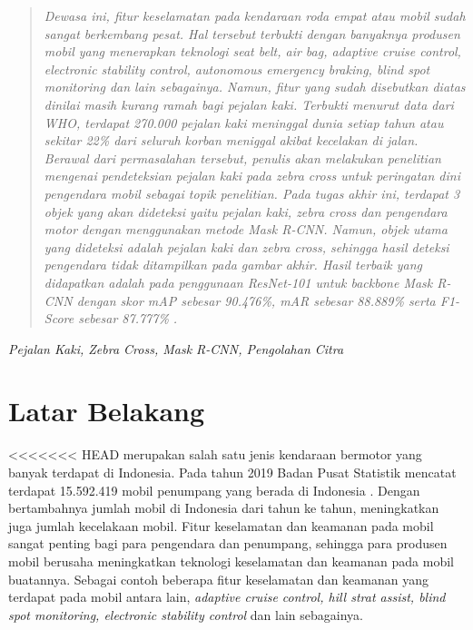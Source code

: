 \documentclass[conference]{IEEEtran}
\begin{document}
	
	\begin{abstract}
		\textit{Dewasa ini, fitur keselamatan pada kendaraan roda empat atau mobil sudah sangat berkembang pesat. Hal tersebut terbukti dengan banyaknya produsen mobil yang menerapkan teknologi \textit{seat belt, air bag, adaptive cruise control, electronic stability control, autonomous emergency braking, blind spot monitoring} dan lain sebagainya. Namun, fitur yang sudah disebutkan diatas dinilai masih kurang ramah bagi pejalan kaki. Terbukti menurut data dari WHO, terdapat 270.000 pejalan kaki meninggal dunia setiap tahun atau sekitar 22\% dari seluruh korban meniggal akibat kecelakan di jalan. Berawal dari permasalahan tersebut, penulis akan melakukan penelitian mengenai pendeteksian pejalan kaki pada \textit{zebra cross} untuk peringatan dini pengendara mobil sebagai topik penelitian. Pada tugas akhir ini, terdapat 3 objek yang akan dideteksi yaitu pejalan kaki, \textit{zebra cross} dan pengendara motor dengan menggunakan metode Mask R-CNN. Namun, objek utama yang dideteksi adalah pejalan kaki dan zebra cross, sehingga hasil deteksi pengendara tidak ditampilkan pada gambar akhir. Hasil terbaik yang didapatkan adalah pada penggunaan \textit{ResNet-101} untuk \textit{backbone Mask R-CNN} dengan skor \textit{mAP} sebesar 90.476\%, mAR sebesar 88.889\% serta \textit{F1-Score} sebesar 87.777\% .}
	\end{abstract}
	\begin{IEEEkeywords}
		\textit{Pejalan Kaki, Zebra Cross, Mask R-CNN, Pengolahan Citra}
	\end{IEEEkeywords}
	
	\section{Latar Belakang}
<<<<<<< HEAD
	 merupakan salah satu jenis kendaraan bermotor yang banyak terdapat di Indonesia. Pada tahun 2019 Badan Pusat Statistik mencatat terdapat 15.592.419 mobil penumpang yang berada di Indonesia \cite{cit:13}. Dengan bertambahnya jumlah mobil di Indonesia dari tahun ke tahun, meningkatkan juga jumlah kecelakaan mobil. Fitur keselamatan dan keamanan pada mobil sangat penting bagi para pengendara dan penumpang, sehingga para produsen mobil berusaha meningkatkan teknologi keselamatan dan keamanan pada mobil buatannya. Sebagai contoh beberapa fitur keselamatan dan keamanan yang terdapat pada mobil antara lain, \textit{adaptive cruise control, hill strat assist, blind spot monitoring, electronic stability control} dan lain sebagainya.
	
\end{document}

